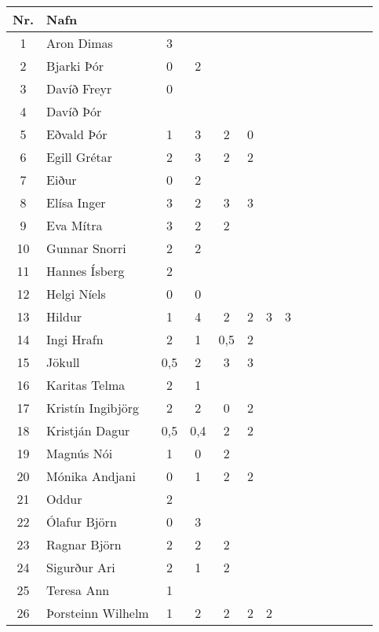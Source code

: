 \begin{table}[H]
    \centering
    \begin{tabular}{|c|l|c|c|c|c|c|c|c|c|c|c|c|c|}
    \hline 
    \textbf{Nr.} & \textbf{Nafn} & \phantom{Mán} & \phantom{Mán} & \phantom{Mán} & \phantom{Mán} & \phantom{Mán} & \phantom{Mán} & \phantom{Mán} & \phantom{Mán} & \phantom{Mán} & \phantom{Mán} & \phantom{Mán} & \phantom{Mán} \\ \hline \hline
       1 & Aron Dimas  & 3 & & & & & & & & & & &  \\ \hline
       2 & Bjarki Þór & 0 & 2 & & & & & & & & &  &  \\ \hline
       3 & Davíð Freyr & 0 & & & & & & & & & & &  \\ \hline
       4 & Davíð Þór & & & & & & & & & & &  & \\ \hline
       5 & Eðvald Þór & 1 & 3 & 2 & 0 & & & & & & & & \\ \hline
       6 & Egill Grétar & 2 & 3 & 2 & 2 & & & & & & & &  \\ \hline
       7 & Eiður & 0 & 2 & & & & & & & & & & \\ \hline
       8 & Elísa Inger & 3 & 2 & 3 & 3 & & & & & & & &  \\ \hline
       9 & Eva Mítra & 3 & 2 & 2 & & & & & & & & &  \\ \hline
       10 & Gunnar Snorri & 2 & 2 & & & & & & & & &  &  \\ \hline
       11 & Hannes Ísberg & 2 & & & & & & & & & & &  \\ \hline
       12 & Helgi Níels & 0 & 0 & & & & & & & & & &  \\ \hline
       13 & Hildur & 1 & 4 & 2 & 2 & 3 & 3 & & & & & &  \\ \hline
       14 & Ingi Hrafn & 2 & 1 & 0,5 & 2 & & & & & & & &  \\ \hline
       15 & Jökull & 0,5 & 2 & 3 & 3 & & & & & & & & \\ \hline
       16 & Karitas Telma & 2 & 1 & & & & & & & & &  &  \\ \hline
       17 & Kristín Ingibjörg & 2 & 2 & 0 & 2 & & & & & & &  &  \\ \hline
       18 & Kristján Dagur & 0,5 & 0,4 & 2 & 2 & & & & & & &  & \\ \hline
       19 & Magnús Nói & 1 & 0 & 2 & & & & & & & & & \\ \hline
       20 & Mónika Andjani & 0 & 1 & 2 & 2 & & & & & & & &  \\ \hline
       21 & Oddur & 2 & & & & & & & & & & &  \\ \hline
       22 & Ólafur Björn & 0 & 3 & & & & & & & & & &  \\ \hline
       23 & Ragnar Björn & 2 & 2 & 2 & & & & & & & & &  \\ \hline
       24 & Sigurður Ari & 2 & 1 & 2 & & & & & & & & & \\ \hline
       25 & Teresa Ann & 1 & & & & & & & & & & & \\ \hline
       26 & Þorsteinn Wilhelm & 1 & 2 & 2 & 2 & 2 & & & & & & &  \\ \hline
    \end{tabular}
\end{table}

